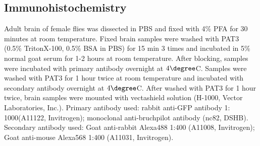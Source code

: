 \subsection*{Immunohistochemistry}

Adult brain of female flies was dissected in PBS and fixed with 4\% PFA for 30 minutes at room temperature.
Fixed brain samples were washed with PAT3 (0.5\% TritonX-100, 0.5\% BSA in PBS) for 15 min 3 times and incubated in 5\% normal goat serum for 1-2 hours at room temperature.
After blocking, samples were incubated with primary antibody overnight at $4\degree$C.
Samples were washed with PAT3 for 1 hour twice at room temperature and incubated with secondary antibody overnight at $4\degree$C.
After washed with PAT3 for 1 hour twice, brain samples were mounted with vectashield solution (H-1000, Vector Laboratories, Inc.).
Primary antibody used: rabbit anti-GFP antibody 1: 1000(A11122, Invitrogen); monoclonal anti-bruchpilot antibody (nc82, DSHB).
Secondary antibody used: Goat anti-rabbit Alexa488 1:400 (A11008, Invitrogen); Goat anti-mouse Alexa568 1:400 (A11031, Invitrogen).